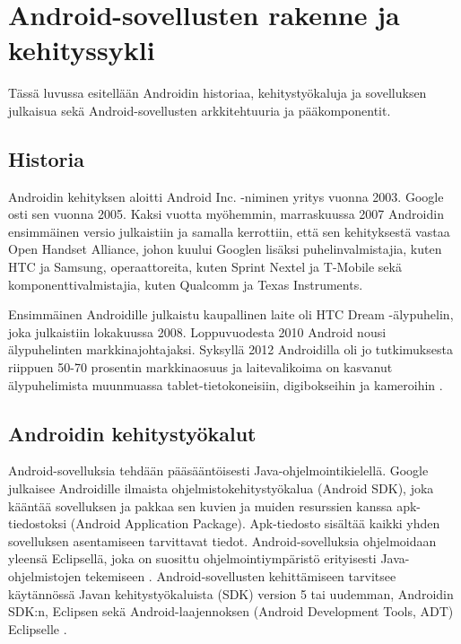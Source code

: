 \section{Android-sovellusten rakenne ja kehityssykli}

Tässä luvussa esitellään Androidin historiaa, kehitystyökaluja ja sovelluksen julkaisua sekä Android-sovellusten arkkitehtuuria ja pääkomponentit.

\subsection{Historia}

Androidin kehityksen aloitti Android Inc. -niminen yritys vuonna 2003. Google osti sen vuonna 2005. Kaksi vuotta myöhemmin, marraskuussa 2007 Androidin ensimmäinen versio julkaistiin ja samalla kerrottiin, että sen kehityksestä vastaa Open Handset Alliance, johon kuului Googlen lisäksi puhelinvalmistajia, kuten HTC ja Samsung, operaattoreita, kuten Sprint Nextel ja T-Mobile sekä komponenttivalmistajia, kuten Qualcomm ja Texas Instruments.

Ensimmäinen Androidille julkaistu kaupallinen laite oli HTC Dream -älypuhelin, joka julkaistiin lokakuussa 2008.
Loppuvuodesta 2010 Android nousi älypuhelinten markkinajohtajaksi. Syksyllä 2012 Androidilla oli jo tutkimuksesta riippuen 50-70 prosentin markkinaosuus ja laitevalikoima on kasvanut älypuhelimista muunmuassa tablet-tietokoneisiin, digibokseihin ja kameroihin \cite{wikiandroid}.

\subsection{Androidin kehitystyökalut}
\label{tools}

Android-sovelluksia tehdään pääsääntöisesti Java-ohjelmointikielellä. Google julkaisee Androidille ilmaista ohjelmistokehitystyökalua (Android SDK), joka kääntää sovelluksen ja pakkaa sen kuvien ja muiden resurssien kanssa apk-tiedostoksi (Android Application Package). Apk-tiedosto sisältää kaikki yhden sovelluksen asentamiseen tarvittavat tiedot. Android-sovelluksia ohjelmoidaan yleensä Eclipsellä, joka on suosittu ohjelmointiympäristö erityisesti Java-ohjelmistojen tekemiseen \cite{eclipse}. Android-sovellusten kehittämiseen tarvitsee käytännössä Javan kehitystyökaluista (SDK) version 5 tai uudemman, Androidin SDK:n, Eclipsen sekä Android-laajennoksen (Android Development Tools, ADT) Eclipselle \cite[25]{androidgamedev}.

